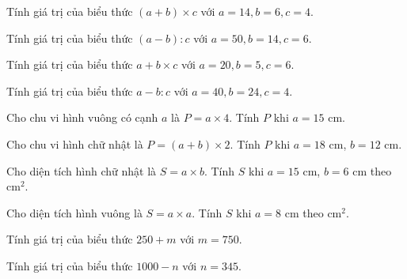 \begin{ex}
Tính giá trị của biểu thức $(a + b) \times c$ với $a = 14, b = 6, c = 4$.
\end{ex}

\begin{ex}
Tính giá trị của biểu thức $(a - b) : c$ với $a = 50, b = 14, c = 6$.
\end{ex}

\begin{ex}
Tính giá trị của biểu thức $a + b \times c$ với $a = 20, b = 5, c = 6$.
\end{ex}

\begin{ex}
Tính giá trị của biểu thức $a - b : c$ với $a = 40, b = 24, c = 4$.
\end{ex}

\begin{ex}
Cho chu vi hình vuông có cạnh $a$ là $P = a \times 4$. Tính $P$ khi $a = 15$ cm.
\end{ex}

\begin{ex}
Cho chu vi hình chữ nhật là $P = (a + b) \times 2$. Tính $P$ khi $a = 18$ cm, $b = 12$ cm.
\end{ex}

\begin{ex}
Cho diện tích hình chữ nhật là $S = a \times b$. Tính $S$ khi $a = 15$ cm, $b = 6$ cm theo $\text{cm}^2$.
\end{ex}

\begin{ex}
Cho diện tích hình vuông là $S = a \times a$. Tính $S$ khi $a = 8$ cm theo $\text{cm}^2$.
\end{ex}

\begin{ex}
Tính giá trị của biểu thức $250 + m$ với $m = 750$.
\end{ex}

\begin{ex}
Tính giá trị của biểu thức $1000 - n$ với $n = 345$.
\end{ex}

